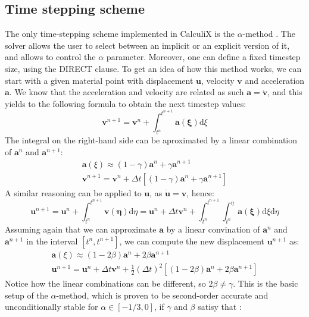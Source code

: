 \documentclass[
  english,        %
  font=times,     %
  onecolumn,      %
]{tumarticle}
\begin{document}
\subsection{Time stepping scheme}\label{sec:alpha}
The only time-stepping scheme implemented in CalculiX is the $\alpha$-method \cite{dhondt2017calculix}. The solver allows the user to select between an implicit or an explicit version of it, and allows to control the $\alpha$ parameter. Moreover, one can define a fixed timestep size, using the DIRECT clause. To get an idea of how this method works, we can start with a given material point with displacement $\boldsymbol{u}$, velocity $\boldsymbol{v}$ and acceleration $\boldsymbol{a}$. We know that the acceleration and velocity are related as such $\boldsymbol{a} = \dot{\boldsymbol{v}}$, and this yields to the following formula to obtain the next timestep values:
\begin{equation}
    \boldsymbol{v}^{n+1} = \boldsymbol{v}^n + \int_{t^n}^{t^{n+1}} \boldsymbol{a(\xi)} \text{d}\xi
\end{equation}
The integral on the right-hand side can be aproximated by a linear combination of $ \boldsymbol{a}^n$ and $\boldsymbol{a}^{n+1}$:
\begin{gather}
    \boldsymbol{a}(\xi) \approx  (1 - \gamma) \boldsymbol{a}^n + \gamma \boldsymbol{a}^{n+1}\\
    \boldsymbol{v}^{n+1} = \boldsymbol{v}^n + \Delta t \left[ (1 - \gamma) \boldsymbol{a}^n + \gamma \boldsymbol{a}^{n+1} \right]
\end{gather} 
A similar reasoning can be applied to $\boldsymbol{u}$, as $\boldsymbol{\dot{u}} = \boldsymbol{v}$, hence:
\begin{equation}
    \boldsymbol{u}^{n+1} 
    = \boldsymbol{u}^n + \int_{t^n}^{t^{n+1}} \boldsymbol{v(\eta)}  \text{d}\eta 
    = \boldsymbol{u}^n + \Delta t \boldsymbol{v}^n + \int_{t^n}^{t^{n+1}} \int_{t^n}^{\eta} \boldsymbol{a(\xi)} \text{d}\xi \text{d}\eta 
\end{equation}
Assuming again that we can approximate $\boldsymbol{a}$ by a linear convination of $ \boldsymbol{a}^n$ and $\boldsymbol{a}^{n+1}$ in the interval $\left[ t^n, t^{n+1} \right]$, we can compute the new displacement $\boldsymbol{u}^{n+1}$ as:
\begin{gather}
    \boldsymbol{a}(\xi) \approx  (1 - 2\beta) \boldsymbol{a}^n + 2\beta \boldsymbol{a}^{n+1}\\
    \boldsymbol{u}^{n+1} = \boldsymbol{u}^n + \Delta t \boldsymbol{v}^n
    + \frac{1}{2} (\Delta t)^2 \left[ (1 - 2\beta) \boldsymbol{a}^n + 2\beta \boldsymbol{a}^{n+1} \right]
\end{gather} 
Notice how the linear combinations can be different, so $2\beta \neq \gamma$. This is the basic setup of the $\alpha$-method, which is proven to be second-order accurate and unconditionally stable for $\alpha \in [-1/3, 0]$, if $\gamma$ and $\beta$ satisy that \cite{dhondt2004finite}:
\end{document}
